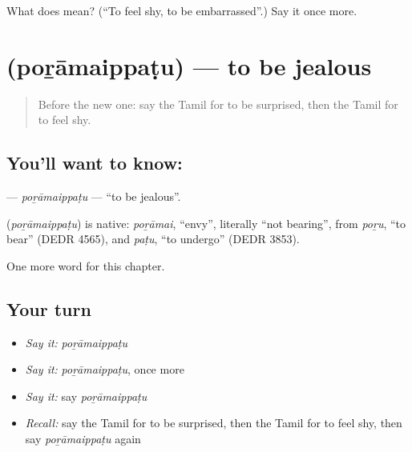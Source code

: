 \begin{tcolorbox}[breakable,colback=teal!4,colframe=teal!35!black,title={Before you move on}]
What does  mean? (\textquotedblleft{}To feel shy, to be embarrassed\textquotedblright{}.) Say it once more.
\end{tcolorbox}
\section[\texorpdfstring{\ta{பொறாமைப்படு} (poṟāmaippaṭu)}{பொறாமைப்படு (poṟāmaippaṭu)}]{ (poṟāmaippaṭu) — to be jealous}

\label{lesson:TA-C257-poramaippatu}



\begin{quote}
Before the new one: say the Tamil for to be surprised, then the Tamil for to feel shy.
\end{quote}

\subsection*{You'll want to know: }
\textbf{} — \emph{poṟāmaippaṭu} — \textquotedblleft{}to be jealous\textquotedblright{}.

\begin{cousinweb}
\textbf{} (\emph{poṟāmaippaṭu}) is native: \emph{poṟāmai}, \textquotedblleft{}envy\textquotedblright{}, literally \textquotedblleft{}not bearing\textquotedblright{}, from \emph{poṟu}, \textquotedblleft{}to bear\textquotedblright{} (DEDR 4565), and \emph{paṭu}, \textquotedblleft{}to undergo\textquotedblright{} (DEDR 3853).
\end{cousinweb}

\begin{grammarlens}[title={What you've built}]
One more word for this chapter.
\end{grammarlens}

\subsection*{Your turn}
\begin{itemize}
\raggedright
  \item \emph{Say it:} \emph{poṟāmaippaṭu}
  \item \emph{Say it:} \emph{poṟāmaippaṭu}, once more
  \item \emph{Say it:} say \emph{poṟāmaippaṭu}
  \item \emph{Recall:} say the Tamil for to be surprised, then the Tamil for to feel shy, then say \emph{poṟāmaippaṭu} again
\end{itemize}


